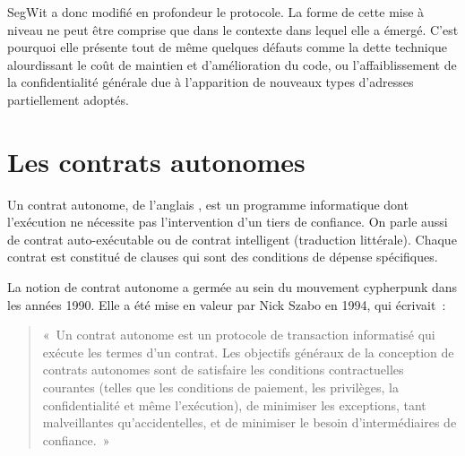 

SegWit a donc modifié en profondeur le protocole. La forme de cette mise à niveau ne peut être comprise que dans le contexte dans lequel elle a émergé. C'est pourquoi elle présente tout de même quelques défauts comme la dette technique alourdissant le coût de maintien et d'amélioration du code, ou l'affaiblissement de la confidentialité générale due à l'apparition de nouveaux types d'adresses partiellement adoptés.

\section*{Les contrats autonomes}

Un contrat autonome, de l'anglais , est un programme informatique dont l'exécution ne nécessite pas l'intervention d'un tiers de confiance. On parle aussi de contrat auto-exécutable ou de contrat intelligent (traduction littérale). Chaque contrat est constitué de clauses qui sont des conditions de dépense spécifiques.

La notion de contrat autonome a germée au sein du mouvement cypherpunk dans les années 1990. Elle a été mise en valeur par Nick Szabo en 1994, qui écrivait~:

\begin{quote}
«~Un contrat autonome est un protocole de transaction informatisé qui exécute les termes d'un contrat. Les objectifs généraux de la conception de contrats autonomes sont de satisfaire les conditions contractuelles courantes (telles que les conditions de paiement, les privilèges, la confidentialité et même l'exécution), de minimiser les exceptions, tant malveillantes qu'accidentelles, et de minimiser le besoin d'intermédiaires de confiance.~»
\end{quote} %

